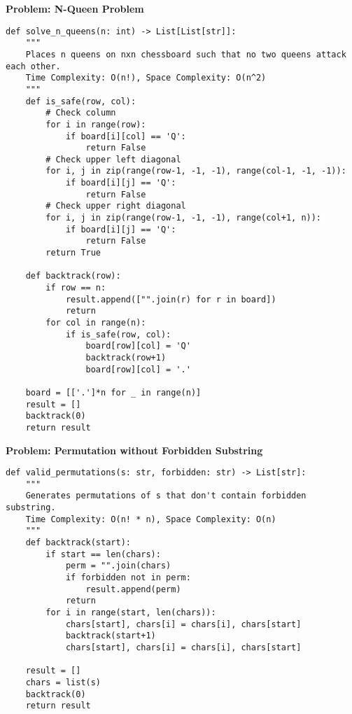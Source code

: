 \noindent\textbf{Problem: N-Queen Problem}
\begin{verbatim}
def solve_n_queens(n: int) -> List[List[str]]:
    """
    Places n queens on nxn chessboard such that no two queens attack each other.
    Time Complexity: O(n!), Space Complexity: O(n^2)
    """
    def is_safe(row, col):
        # Check column
        for i in range(row):
            if board[i][col] == 'Q':
                return False
        # Check upper left diagonal
        for i, j in zip(range(row-1, -1, -1), range(col-1, -1, -1)):
            if board[i][j] == 'Q':
                return False
        # Check upper right diagonal
        for i, j in zip(range(row-1, -1, -1), range(col+1, n)):
            if board[i][j] == 'Q':
                return False
        return True
        
    def backtrack(row):
        if row == n:
            result.append(["".join(r) for r in board])
            return
        for col in range(n):
            if is_safe(row, col):
                board[row][col] = 'Q'
                backtrack(row+1)
                board[row][col] = '.'
                
    board = [['.']*n for _ in range(n)]
    result = []
    backtrack(0)
    return result
\end{verbatim}

\noindent\textbf{Problem: Permutation without Forbidden Substring}
\begin{verbatim}
def valid_permutations(s: str, forbidden: str) -> List[str]:
    """
    Generates permutations of s that don't contain forbidden substring.
    Time Complexity: O(n! * n), Space Complexity: O(n)
    """
    def backtrack(start):
        if start == len(chars):
            perm = "".join(chars)
            if forbidden not in perm:
                result.append(perm)
            return
        for i in range(start, len(chars)):
            chars[start], chars[i] = chars[i], chars[start]
            backtrack(start+1)
            chars[start], chars[i] = chars[i], chars[start]
            
    result = []
    chars = list(s)
    backtrack(0)
    return result
\end{verbatim}

